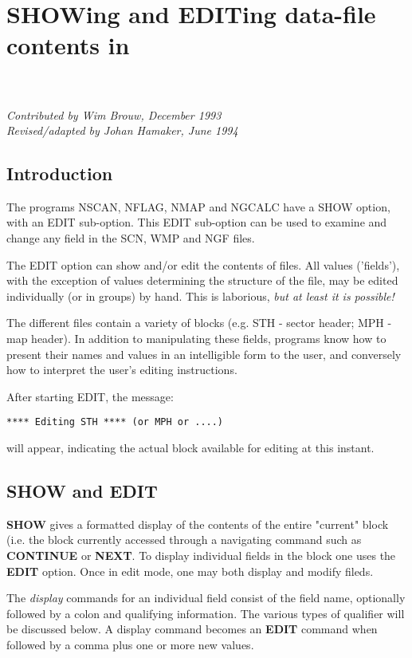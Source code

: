 
\chapter{SHOWing and EDITing data-file contents in \NEWSTAR} 
\\ \\
{\it 
\indent  Contributed by Wim Brouw, December 1993 \\ 
\indent  Revised/adapted by Johan Hamaker, June 1994 } 

\tableofcontents 


\section{ Introduction} 


	The programs NSCAN, NFLAG, NMAP and NGCALC have a SHOW option, with an
EDIT sub-option.  This EDIT sub-option can be used to examine and change any
field in the SCN, WMP and NGF files. 

	The EDIT option can show and/or edit the contents of \NEWSTAR files.
All values ('fields'), with the exception of values determining the structure
of the file, may be edited individually (or in groups) by hand.  This is
laborious, {\em but at least it is possible!} 

	The different files contain a variety of blocks (e.g.  STH - sector
header; MPH - map header).  In addition to manipulating these fields, \NEWSTAR
programs know how to present their names and values in an intelligible form to
the user, and conversely how to interpret the user's editing instructions. 

	After starting EDIT, the message: 

	\verb/**** Editing STH **** (or MPH or ....)/ 

\noindent will appear, indicating the actual block available for editing at
this instant. 

\section{SHOW and EDIT} 

	{\bf SHOW} gives a formatted display of the contents of the entire
"current" block (i.e.  the block currently accessed through a navigating
command such as {\bf CONTINUE} or {\bf NEXT}.  To display individual fields in
the block one uses the {\bf EDIT} option.  Once in edit mode, one may both
display and modify fileds. 

	The {\it display} commands for an individual field consist of the field
name, optionally followed by a colon and qualifying information.  The various
types of qualifier will be discussed below.  A display command becomes an {\bf
EDIT} command when followed by a comma plus one or more new values. 

